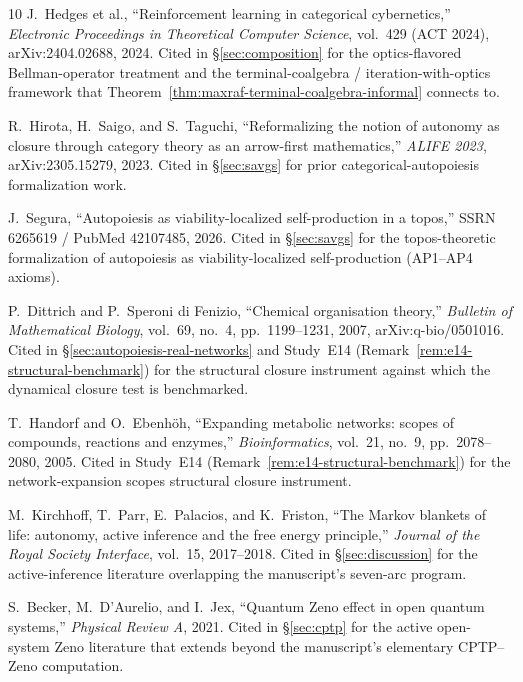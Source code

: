 \documentclass[11pt,a4paper]{article}
\theoremstyle{plain}
\theoremstyle{definition}
\theoremstyle{remark}
\begin{document}
\begin{thebibliography}{10}
J.~Hedges et al., ``Reinforcement learning in categorical cybernetics,''
  \emph{Electronic Proceedings in Theoretical Computer Science}, vol.~429
  (ACT 2024), arXiv:2404.02688, 2024. Cited in \S\ref{sec:composition}
  for the optics-flavored Bellman-operator treatment and the
  terminal-coalgebra / iteration-with-optics framework that
  Theorem~\ref{thm:maxraf-terminal-coalgebra-informal} connects to.

R.~Hirota, H.~Saigo, and S.~Taguchi, ``Reformalizing the notion of
  autonomy as closure through category theory as an arrow-first
  mathematics,'' \emph{ALIFE 2023}, arXiv:2305.15279, 2023. Cited in
  \S\ref{sec:savgs} for prior categorical-autopoiesis formalization work.

J.~Segura, ``Autopoiesis as viability-localized self-production in a
  topos,'' SSRN 6265619 / PubMed 42107485, 2026. Cited in
  \S\ref{sec:savgs} for the topos-theoretic formalization of autopoiesis
  as viability-localized self-production (AP1--AP4 axioms).

P.~Dittrich and P.~Speroni di Fenizio, ``Chemical organisation
  theory,'' \emph{Bulletin of Mathematical Biology}, vol.~69, no.~4,
  pp.~1199--1231, 2007, arXiv:q-bio/0501016. Cited in
  \S\ref{sec:autopoiesis-real-networks} and Study~E14
  (Remark~\ref{rem:e14-structural-benchmark}) for the structural closure
  instrument against which the dynamical closure test is benchmarked.

T.~Handorf and O.~Ebenh\"oh, ``Expanding metabolic networks: scopes of
  compounds, reactions and enzymes,'' \emph{Bioinformatics}, vol.~21,
  no.~9, pp.~2078--2080, 2005. Cited in Study~E14
  (Remark~\ref{rem:e14-structural-benchmark}) for the network-expansion
  scopes structural closure instrument.

M.~Kirchhoff, T.~Parr, E.~Palacios, and K.~Friston, ``The Markov blankets
  of life: autonomy, active inference and the free energy principle,''
  \emph{Journal of the Royal Society Interface}, vol.~15, 2017--2018.
  Cited in \S\ref{sec:discussion} for the active-inference literature
  overlapping the manuscript's seven-arc program.

S.~Becker, M.~D'Aurelio, and I.~Jex, ``Quantum Zeno effect in open
  quantum systems,'' \emph{Physical Review A}, 2021. Cited in
  \S\ref{sec:cptp} for the active open-system Zeno literature that
  extends beyond the manuscript's elementary CPTP--Zeno computation.


\end{thebibliography}
\end{document}
